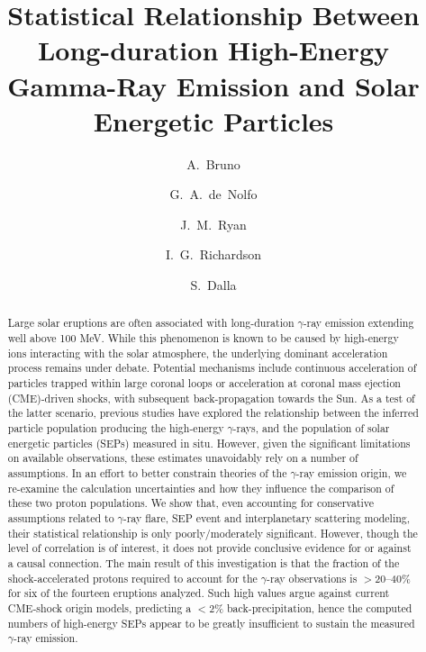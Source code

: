 \documentclass{aastex61}
\begin{document}
\title{Statistical Relationship Between Long-duration High-Energy Gamma-Ray Emission and Solar Energetic Particles}

\author{A.~Bruno}
\author{G.~A.~de~Nolfo}
\author{J.~M.~Ryan}
\author{I.~G.~Richardson}
\author{S.~Dalla}


\begin{abstract}
Large solar eruptions are often associated with long-duration $\gamma$-ray emission extending well above 100 MeV. While this phenomenon is known to be caused by high-energy ions interacting with the solar atmosphere, the underlying dominant acceleration process remains under debate. Potential mechanisms include continuous acceleration of particles trapped within large coronal loops or acceleration at coronal mass ejection (CME)-driven shocks, with subsequent back-propagation towards the Sun. As a test of the latter scenario, previous studies have explored the relationship between the inferred particle population producing the high-energy $\gamma$-rays, and the population of solar energetic particles (SEPs) measured in situ. However, given the significant limitations on available observations, these estimates unavoidably rely on a number of assumptions. In an effort to better constrain theories of the $\gamma$-ray emission origin, we re-examine the calculation uncertainties and how they influence the comparison of these two proton populations. We show that, even accounting for conservative assumptions related to $\gamma$-ray flare, SEP event and interplanetary scattering modeling, their statistical relationship is only poorly/moderately significant. However, though the level of correlation is of interest, it does not provide conclusive evidence for or against a causal connection. The main result of this investigation is that the fraction of the shock-accelerated protons required to account for the $\gamma$-ray observations is $>$20--40\% for six of the fourteen eruptions analyzed. Such high values argue against current CME-shock origin models, predicting a $<$2\% back-precipitation, hence the computed numbers of high-energy SEPs appear to be greatly insufficient to sustain the measured $\gamma$-ray emission.
\end{abstract}
\end{document}
